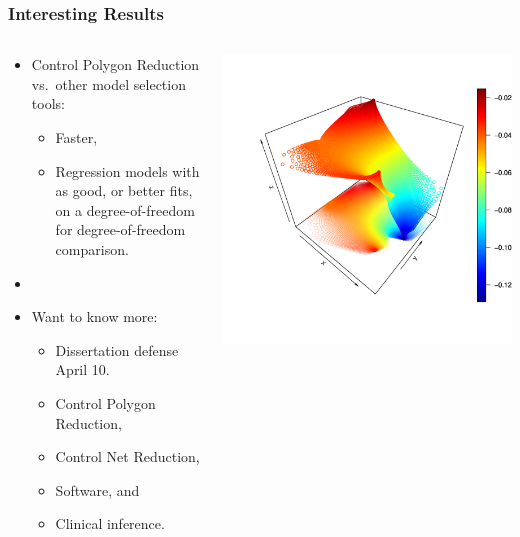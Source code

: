 \documentclass[10pt]{beamer}
\begin{document}
\begin{frame}
  \frametitle{Interesting Results}
  \begin{columns}
    \begin{column}{0.6\linewidth}
  \begin{itemize}
    \item Control Polygon Reduction vs.\ other model selection tools:
      \begin{itemize}
        \item Faster,
        \item Regression models with as good, or better fits, on a
          degree-of-freedom for degree-of-freedom comparison.
      \end{itemize}
    \item[]
    \item Want to know more: 
      \begin{itemize}
        \item Dissertation defense April 10.
        \item Control Polygon Reduction,
        \item Control Net Reduction,
        \item Software, and
        \item Clinical inference.
      \end{itemize}
  \end{itemize} 
\end{column}
\begin{column}{0.4\linewidth}
  \includegraphics[width=\textwidth]{Rplots}
\end{column}
\end{columns}
\end{frame}
\end{document}
